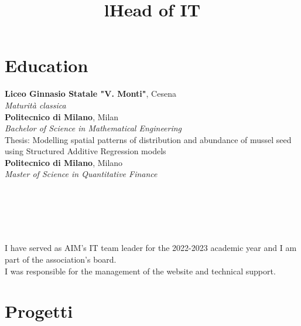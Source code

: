 \documentclass[margin]{res}
\begin{document}
\begin{resume}

\section{Education}
\textbf{Liceo Ginnasio Statale "V. Monti"}, Cesena\\
{\sl Maturità classica}\\
\textbf{Politecnico di Milano}, Milan\\
{\sl Bachelor of Science in Mathematical Engineering} \\
Thesis: Modelling spatial patterns of distribution and abundance of mussel seed using Structured Additive Regression models\\
\textbf{Politecnico di Milano}, Milano\\
{\sl Master of Science in Quantitative Finance}

\begin{format}
\title{l}\\
\\
\body\\
\end{format}

\title{\textbf{Head of IT}}
\begin{position}
\null \\
I have served as AIM's IT team leader for the 2022-2023 academic year and I am part of the association's board.\\
I was responsible for the management of the website and technical support.
\end{position}

\section{Progetti}


\end{resume}
\end{document}
